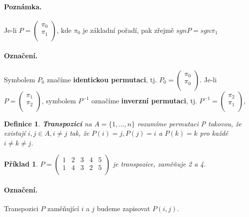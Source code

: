 \documentclass[12pt,a4paper]{article}
\newtheorem{definition}{Definice}
\newtheorem{example}{Příklad}
\begin{document}
\paragraph{Poznámka.} Je-li $P = \left( \begin{array}{c} \pi_0 \\ \pi_1 \\ \end{array} \right)$, kde $\pi_0$ je základní pořadí, pak zřejmě $sgnP = sgn\pi_1$

\paragraph{Označení.} Symbolem $P_0$ značíme \textbf{identickou permutaci}, tj. $P_0 = \left( \begin{array}{c} \pi_0 \\ \pi_0 \\ \end{array} \right)$. Je-li $P = \left( \begin{array}{c} \pi_1 \\ \pi_2 \\ \end{array} \right)$, symbolem $P^{-1}$ označíme \textbf{inverzní permutaci}, tj. $P^{-1} = \left( \begin{array}{c} \pi_2 \\ \pi_1 \\ \end{array} \right)$,

\begin{definition}
	\textbf{Transpozicí} na $A = \{1, \dots, n\}$ rozumíme permutaci P takovou, že existují $i,j \in A, i \not= j$ tak, že $P(i) = j, P(j) = i$ a $P(k) = k$ pro každé $i \not= k \not= j$.
\end{definition}

\begin{example}
	$P = \left( \begin{array}{cccccc} 1 & 2 & 3 & 4 & 5\\ 1 & 4 & 3 & 2 & 5 \\ \end{array} \right)$ je transpozice, zaměňuje 2 a 4.
\end{example}

\paragraph{Označení.} Transpozici $P$ zaměňující $i$ a $j$ budeme zapisovat $P(i,j)$.
\end{document}
